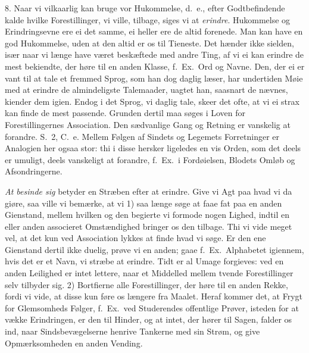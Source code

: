 \documentclass[12pt,a4paper]{article}
\newcommand{\opage}[1]{\marginnote{\footnotesize\textit{[#1]}}}
\begin{document}
8. Naar vi vilkaarlig kan bruge vor Hukommelse, d.~e., efter Godtbefindende kalde hvilke
Forestillinger, vi ville, tilbage, siges vi at \emph{erindre}. Hukommelse og
Erindringsevne ere ei det samme, ei heller ere de altid forenede. Man kan have en god
Hukommelse, uden at den altid er os til Tieneste. Det hænder ikke sielden, især naar vi
længe have været beskæftede med andre Ting, af vi ei kan erindre de mest bekiendte, der
\opage{110} høre til en anden Klasse, f.~Ex.\ Ord og Navne. Den, der ei er vant til at tale et
fremmed Sprog, som han dog daglig læser, har undertiden Møie med at erindre de
almindeligste Talemaader, uagtet han, saasnart de nævnes, kiender dem igien. Endog i det
Sprog, vi daglig tale, skeer det ofte, at vi ei strax kan finde de mest passende. Grunden
dertil maa søges i Loven for Forestillingernes Association. Den sædvanlige Gang og
Retning er vanskelig at forandre. S.~2, C.~e. Mellem Følgen af Sindets og Legemets
Forretninger er Analogien her ogsaa stor: thi i disse hersker ligeledes en vis Orden, som
det deels er umuligt, deels vanskeligt at forandre, f.~Ex.\ i Fordøielsen, Blodets Omløb
og Afsondringerne.

\emph{At besinde sig} betyder en Stræben efter at erindre. Give vi Agt paa hvad vi da
giøre, saa ville vi bemærke, at vi 1) saa længe søge at faae fat paa en anden Gienstand,
mellem hvilken og den begierte vi formode nogen Lighed, indtil en eller anden associeret
Omstændighed bringer os den tilbage. Thi vi vide meget vel, at det kun ved Association
lykkes at finde hvad vi søge. Er den ene Gienstand dertil ikke duelig, prøve vi en anden;
gaae f.~Ex.\ Alphabetet igiennem, hvis det er et Navn, vi stræbe at erindre. Tidt er al
Umage forgieves: ved en anden Leilighed er intet lettere, naar et Middelled mellem tvende
Forestillinger selv tilbyder sig. 2) Bortfierne alle Forestillinger, der høre
\opage{111} til en anden Rekke, fordi vi vide, at disse kun føre os længere fra Maalet. Heraf kommer
det, at Frygt for Glemsomheds Følger, f.~Ex.\ ved Studerendes offentlige Prøver, isteden
for at vække Erindringen, er den til Hinder, og at intet, der hører til Sagen, falder os
ind, naar Sindsbevægelserne henrive Tankerne med sin Strøm, og give Opmærksomheden en
anden Vending.
\end{document}
